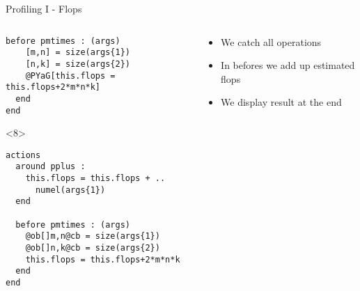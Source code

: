 \begin{frame}[fragile]{Profiling I - Flops}
\begin{columns}
\begin{column}[T]{5cm}
\begin{onlyenv}
\begin{Verbatim}[commandchars=@\[\]]
  before pmtimes : (args)
    [m,n] = size(args{1})
    [n,k] = size(args{2})
    @PYaG[this.flops = this.flops+2*m*n*k]
  end
end
        \end{Verbatim}
      \end{onlyenv}
        \begin{onlyenv}<8>
          \begin{Verbatim}[commandchars=@\[\]]
actions
  around pplus : 
    this.flops = this.flops + ..
      numel(args{1})
  end
        
  before pmtimes : (args)
    @ob[]m,n@cb = size(args{1})
    @ob[]n,k@cb = size(args{2})
    this.flops = this.flops+2*m*n*k
  end
end
        \end{Verbatim}
      \end{onlyenv}
      \end{column}
      \begin{column}[T]{5cm}
        \begin{itemize}
          \pause \item We catch all operations
          \pause \pause \item In befores we add up estimated flops
          \pause \item We display result at the end
        \end{itemize}
      \end{column}
    \end{columns}



\end{frame}

